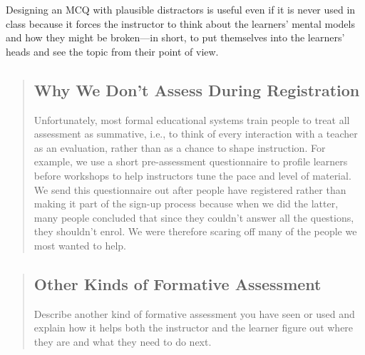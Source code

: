 Designing an MCQ with plausible distractors is useful
even if it is never used in class
because it forces the instructor to think about the learners' mental models
and how they might be broken---in short,
to put themselves into the learners' heads
and see the topic from their point of view.

\begin{quotation}   %
\subsection*{Why We Don't Assess During Registration}

Unfortunately,
most formal educational systems train people to treat all assessment as summative,
i.e.,
to think of every interaction with a teacher as an evaluation,
rather than as a chance to shape instruction.
For example,
we use a short pre-assessment questionnaire to profile learners before workshops
to help instructors tune the pace and level of material.
We send this questionnaire out after people have registered
rather than making it part of the sign-up process because when we did the latter,
many people concluded that since they couldn't answer all the questions,
they shouldn't enrol.
We were therefore scaring off many of the people we most wanted to help.
\end{quotation}   %

\begin{quotation}   %
\subsection*{Other Kinds of Formative Assessment}

Describe another kind of formative assessment you have seen or used
and explain how it helps both the instructor and the learner figure out
where they are and what they need to do next.
\end{quotation}   %

